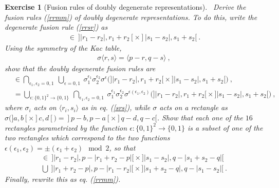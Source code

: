 \documentclass[12pt,a4paper,notitlepage]{report}
\numberwithin{equation}{section}
\theoremstyle{break}
\newtheorem{exo}{Exercise}[chapter]
\begin{document}
\begin{exo}[Fusion rules of doubly degenerate representations]
 ~\label{exofus}
Derive the fusion rules (\ref{rrmm}) of doubly degenerate representations. To do this, write the degenerate fusion rule (\ref{rrsr}) as 
\begin{align}
[r_3,s_3]\in\ ]|r_1-r_2|,r_1+r_2[ \times ]|s_1-s_2|,s_1+s_2[ \ .
\end{align}
Using the symmetry of the Kac table,
\begin{align}
 \sigma\langle r,s \rangle = \langle p-r,q-s\rangle\ ,
\label{srs}
\end{align}
show that the doubly degenerate fusion rules are
\begin{align}
[r_3,s_3]& \in \bigcap_{\epsilon_1,\epsilon_2 = 0,1}\ \bigcup_{\epsilon=0,1} \ \sigma_1^{\epsilon_1} \sigma_2^{\epsilon_2} \sigma^{\epsilon}
\Big( \big]|r_1-r_2|,r_1+r_2\big[ \times \big]|s_1-s_2|,s_1+s_2\big[  \Big)\ ,
\\
& = \bigcup_{\epsilon:\{0,1\}^2 \rightarrow \{0,1\} }\ \bigcap_{\epsilon_1,\epsilon_2=0,1} \ \sigma_1^{\epsilon_1} \sigma_2^{\epsilon_2} \sigma^{\epsilon(\epsilon_1,\epsilon_2)} \Big( \big]|r_1-r_2|,r_1+r_2\big[ \times \big]|s_1-s_2|,s_1+s_2\big[  \Big)\ ,
\end{align}
where $\sigma_i$ acts on $\langle r_i,s_i\rangle$ as in eq. (\ref{srs}), while $\sigma$ acts on a rectangle as $\sigma\big(]a,b[\times]c,d[\big) = ]p-b,p-a[\times ]q-d,q-c[$. Show that each one of the $16$ rectangles parametrized by the function $\epsilon:\{0,1\}^2 \rightarrow \{0,1\} $ is a subset of one of the two rectangles which correspond to the two functions $\epsilon(\epsilon_1,\epsilon_2)=\pm (\epsilon_1+\epsilon_2) \mod 2$, so that 
\begin{multline}
 [r_3,s_3]  \in\  \big]|r_1-r_2|,p-|r_1+r_2-p|\big[\times \big]|s_1-s_2|,q-|s_1+s_2-q|\big[ 
\\
 \bigcup\ \big]|r_1+r_2-p|,p-|r_1-r_2|\big[\times \big]|s_1+s_2-q|,q-|s_1-s_2|\big[\ .
\end{multline}
Finally, rewrite this as eq. (\ref{rrmm}).
\end{exo}
\end{document}
